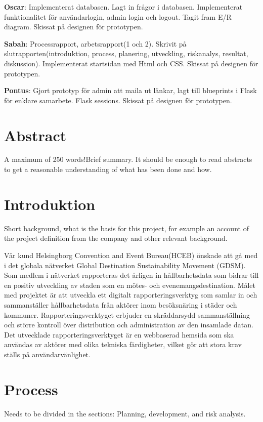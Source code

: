\documentclass[12pt]{article}
\begin{document}
\textbf{Oscar}: Implementerat databasen. Lagt in frågor i databasen. Implementerat funktionalitet för användarlogin, admin login och logout. Tagit fram E/R diagram. Skissat på designen för prototypen.

\textbf{Sabah}: Processrapport, arbetsrapport(1 och 2). Skrivit på slutrapporten(introduktion, process, planering, utveckling, riskanalys, resultat, diskussion). Implementerat startsidan med Html och CSS. Skissat på designen för prototypen.  

\textbf{Pontus}: Gjort prototyp för admin att maila ut länkar, lagt till blueprints i Flask för enklare samarbete. Flask sessions. Skissat på designen för prototypen.


\section{Abstract}
A maximum of 250 words!Brief summary. It should be enough to read abstracts to get a reasonable understanding of what has been done and how.

\section{Introduktion}
Short background, what is the basis for this project, for example an account of the project definition from the company and other relevant background.

Vår kund Helsingborg Convention and Event Bureau(HCEB) önskade att gå med i det globala nätverket Global Destination Sustainability Movement (GDSM). Som medlem i nätverket rapporteras det årligen in hållbarhetsdata som bidrar till en positiv utveckling av staden som en mötes- och evenemangsdestination. Målet med projektet är att utveckla ett digitalt rapporteringsverktyg som samlar in och sammanställer hållbarhetsdata från aktörer inom besöksnäring i städer och kommuner. Rapporteringsverktyget erbjuder en skräddarsydd sammanställning och större kontroll över distribution och administration av den insamlade datan. Det utvecklade rapporteringsverktyget är en webbaserad hemsida som ska användas av aktörer med olika tekniska färdigheter, vilket gör att stora krav ställs på användarvänlighet.





\section{Process}
Needs to be divided in the sections: Planning, development, and risk analysis.
\end{document}
